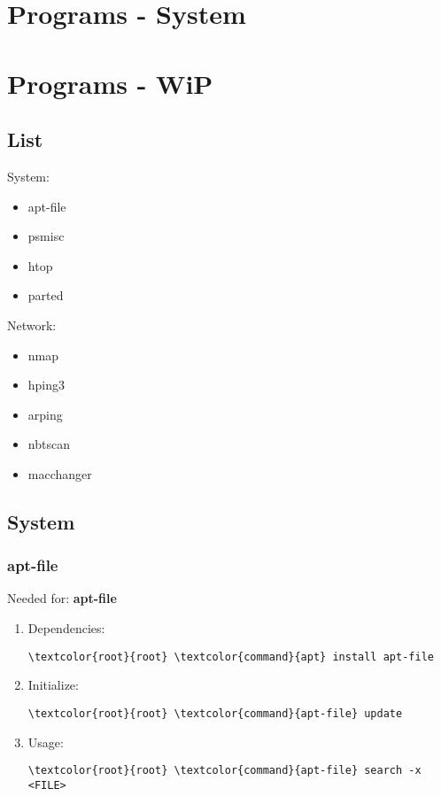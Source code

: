 \documentclass[10pt, a4paper, onecolumn, openany]{book} %
\begin{document}
\chapter{Programs - System}

\chapter{Programs - WiP}
\section{List}
System:
\begin{itemize}
    \item apt-file
    \item psmisc
    \item htop
    \item parted
\end{itemize}
Network:
\begin{itemize}
    \item nmap
    \item hping3
    \item arping
    \item nbtscan
    \item macchanger
\end{itemize}
\section{System}
\subsection{apt-file}
Needed for: \textbf{apt-file}
\begin{enumerate}
    \item Dependencies:
\begin{Verbatim}[commandchars=\\\{\}]
\textcolor{root}{root} \textcolor{command}{apt} install apt-file
\end{Verbatim}
    \item Initialize:
\begin{Verbatim}[commandchars=\\\{\}]
\textcolor{root}{root} \textcolor{command}{apt-file} update
\end{Verbatim}
    \item Usage:
\begin{Verbatim}[commandchars=\\\{\}]
\textcolor{root}{root} \textcolor{command}{apt-file} search -x <FILE>
\end{Verbatim}
\end{enumerate}
\end{document}
